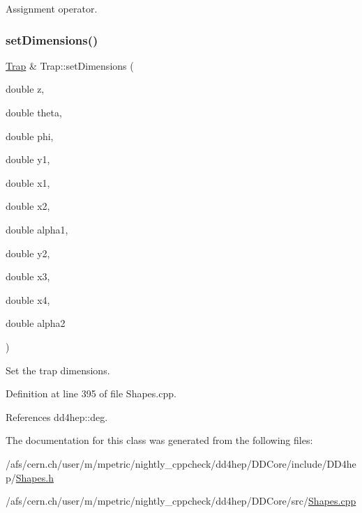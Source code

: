 Assignment operator. 

\hypertarget{class_d_d4hep_1_1_geometry_1_1_trap_a577c150f75380ee4b93ec1c339066561}{}\label{class_d_d4hep_1_1_geometry_1_1_trap_a577c150f75380ee4b93ec1c339066561} 
\subsubsection{\texorpdfstring{set\+Dimensions()}{setDimensions()}}
{\footnotesize\ttfamily \hyperlink{class_d_d4hep_1_1_geometry_1_1_trap}{Trap} \& Trap\+::set\+Dimensions (\begin{DoxyParamCaption}\item[{double}]{z,  }\item[{double}]{theta,  }\item[{double}]{phi,  }\item[{double}]{y1,  }\item[{double}]{x1,  }\item[{double}]{x2,  }\item[{double}]{alpha1,  }\item[{double}]{y2,  }\item[{double}]{x3,  }\item[{double}]{x4,  }\item[{double}]{alpha2 }\end{DoxyParamCaption})}



Set the trap dimensions. 



Definition at line 395 of file Shapes.\+cpp.



References dd4hep\+::deg.



The documentation for this class was generated from the following files\+:\begin{DoxyCompactItemize}
\item 
/afs/cern.\+ch/user/m/mpetric/nightly\+\_\+cppcheck/dd4hep/\+D\+D\+Core/include/\+D\+D4hep/\hyperlink{_shapes_8h}{Shapes.\+h}\item 
/afs/cern.\+ch/user/m/mpetric/nightly\+\_\+cppcheck/dd4hep/\+D\+D\+Core/src/\hyperlink{_shapes_8cpp}{Shapes.\+cpp}\end{DoxyCompactItemize}
